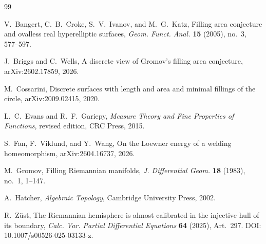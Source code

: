 \documentclass[11pt]{article}
\begin{document}
\begin{thebibliography}{99}

V.~Bangert, C.~B.~Croke, S.~V.~Ivanov, and M.~G.~Katz,
\newblock Filling area conjecture and ovalless real hyperelliptic surfaces,
\newblock \emph{Geom. Funct. Anal.} \textbf{15} (2005), no.~3, 577--597.

J.~Briggs and C.~Wells,
\newblock A discrete view of Gromov's filling area conjecture,
\newblock arXiv:2602.17859, 2026.

M.~Cossarini,
\newblock Discrete surfaces with length and area and minimal fillings of the circle,
\newblock arXiv:2009.02415, 2020.

L.~C.~Evans and R.~F.~Gariepy,
\newblock \emph{Measure Theory and Fine Properties of Functions},
\newblock revised edition, CRC Press, 2015.


S.~Fan, F.~Viklund, and Y.~Wang,
\newblock On the Loewner energy of a welding homeomorphism,
\newblock arXiv:2604.16737, 2026.

M.~Gromov,
\newblock Filling Riemannian manifolds,
\newblock \emph{J. Differential Geom.} \textbf{18} (1983), no.~1, 1--147.

A.~Hatcher,
\newblock \emph{Algebraic Topology},
\newblock Cambridge University Press, 2002.

R.~Z\"ust,
\newblock The Riemannian hemisphere is almost calibrated in the injective hull of its boundary,
\newblock \emph{Calc. Var. Partial Differential Equations} \textbf{64} (2025),
Art.~297.
\newblock DOI: 10.1007/s00526-025-03133-z.

\end{thebibliography}
\end{document}
